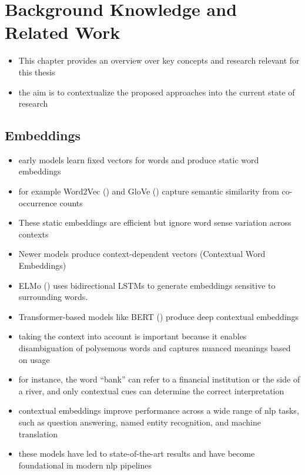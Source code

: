 \chapter{Background Knowledge and Related Work}
\label{sec:background}
\begin{itemize}
  \item This chapter provides an overview over key concepts and research relevant for this thesis
  \item the aim is to contextualize the proposed approaches into the current state of research
\end{itemize}


\section{Embeddings}
\label{sec:background:embeddings}
\begin{itemize}
  \item early models learn fixed vectors for words and produce static word embeddings
  \item for example Word2Vec (\cite{mikolovEfficientEstimationWord2013}) and GloVe (\cite{penningtonGloveGlobalVectors2014}) capture semantic similarity from co-occurrence counts
  \item These static embeddings are efficient but ignore word sense variation across contexts
  \item Newer models produce context-dependent vectors (Contextual Word Embeddings)
  \item ELMo (\cite{petersDeepContextualizedWord2018}) uses bidirectional LSTMs to generate embeddings sensitive to surrounding words.
  \item Transformer-based models like BERT (\cite{devlin-etal-2019-bert}) produce deep contextual embeddings
  \item taking the context into account is important because it enables disambiguation of polysemous words and captures nuanced meanings based on usage
  \item for instance, the word \enquote{bank} can refer to a financial institution or the side of a river, and only contextual cues can determine the correct interpretation
  \item contextual embeddings improve performance across a wide range of \ac{nlp} tasks, such as question answering, named entity recognition, and machine translation
  \item these models have led to state-of-the-art results and have become foundational in modern \ac{nlp} pipelines
\end{itemize}


